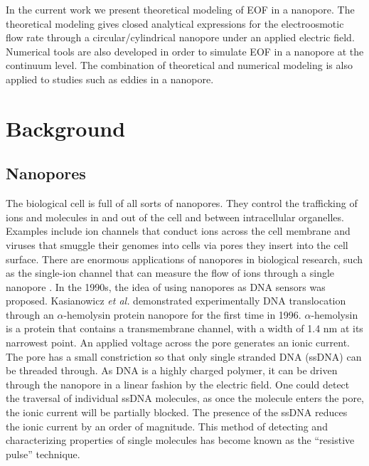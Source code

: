 In the current work we present theoretical modeling of EOF in a nanopore. The theoretical modeling gives closed analytical expressions for the electroosmotic flow rate through a circular\//cylindrical nanopore under an applied electric field. Numerical tools are also developed in order to simulate EOF in a nanopore at the continuum level. The combination of theoretical and numerical modeling is also applied to studies such as eddies in a nanopore.

\section{Background}
\label{intro-bkg}
\subsection{Nanopores}
The biological cell is full of all sorts of nanopores. They control the trafficking of ions and molecules in and out of the cell and between intracellular organelles. Examples include ion channels that conduct ions across the cell membrane and viruses that smuggle their genomes into cells via pores they insert into the cell surface. There are enormous applications of nanopores in biological research, such as the single-ion channel that can measure the flow of ions through a single nanopore \cite{sakmann1983single}. In the 1990s, the idea of using nanopores as DNA sensors was proposed. Kasianowicz \cite{Kasianowicz1996} {\it et al.} demonstrated experimentally DNA translocation through an $\alpha$-hemolysin protein nanopore for the first time in 1996. $\alpha$-hemolysin is a protein that contains a transmembrane channel, with a width of 1.4 nm at its narrowest point. An applied voltage across the pore generates an ionic current. The pore has a small constriction so that 
 only single stranded DNA (ssDNA) can be threaded through. As DNA is a highly charged polymer, it can be driven through the nanopore in a linear fashion by the electric field. One could detect the traversal of individual ssDNA molecules, as once the molecule enters the pore, the ionic current will be partially blocked. The presence of the ssDNA reduces the ionic current by an order of magnitude. This method of detecting and characterizing properties of single molecules has become known as the ``resistive pulse'' technique.

